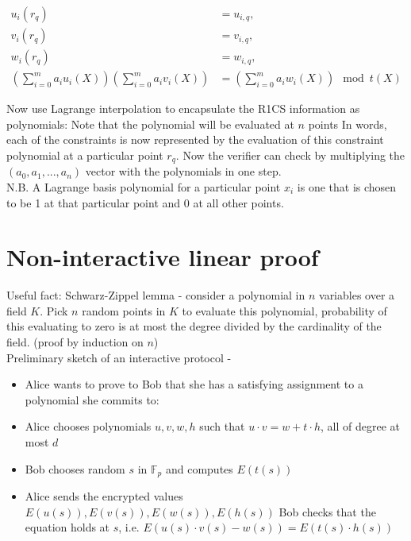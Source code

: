 \documentclass[12pt]{article}
\begin{document}
\begin{align*}
  u_i(r_q) &= u_{i,q}, \quad\\
  v_i(r_q) &= v_{i,q}, \quad\\
  w_i(r_q) &= w_{i,q}, \quad\\
  \left(\sum_{i=0}^m a_i u_i(X)\right)\left(\sum_{i=0}^m a_i v_i(X)\right)
           &= \left(\sum_{i=0}^m a_i w_i(X)\right) \mod t(X)
\end{align*}

Now use Lagrange interpolation to encapsulate the R1CS information as polynomials:
Note that the polynomial will be evaluated at $n$ points
In words, each of the constraints is now represented by the evaluation of 
this constraint polynomial at a particular point $r_q$. Now the verifier can check by multiplying 
the $(a_0, a_1, ..., a_n)$ vector with the polynomials in one step.\\

N.B. A Lagrange basis polynomial for a particular point $x_i$ is one 
that is chosen to be 1 at that particular point and 0 at all other points.

\section*{Non-interactive linear proof}

Useful fact: Schwarz-Zippel lemma - consider a polynomial in $n$ variables over a field $K$. Pick $n$ random points in $K$ to evaluate this polynomial, probability of this evaluating to zero is at most the degree divided by the cardinality of the field. (proof by induction on $n$)\\

Preliminary sketch of an interactive protocol -
\begin{itemize}
\item Alice wants to prove to Bob that she has a satisfying assignment
  to a polynomial she commits to:
\item 
  Alice chooses polynomials $u, v, w, h$ such that $u\cdot v = w + t\cdot h$, all of
  degree at most $d$
  
\item 
  Bob chooses random $s$ in $\mathbb{F}_p$ and computes $E(t(s))$
\item
  Alice sends the encrypted values $E(u(s)), E(v(s)), E(w(s)), E(h(s))$
  Bob checks that the equation holds at $s$, i.e.
  $E(u(s)\cdot v(s)-w(s)) = E(t(s)\cdot h(s))$

\end{itemize}
\end{document}
